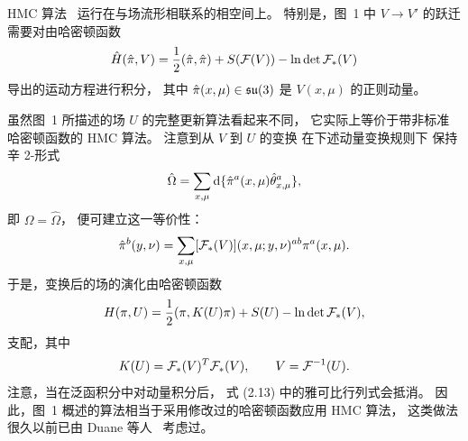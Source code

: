 HMC 算法~\cite{HMC} 运行在与场流形相联系的相空间上。
特别是，图~1 中 $V\to V'$ 的跃迁
需要对由哈密顿函数
\begin{equation}
  \hat{H}(\hat{\pi},V)=
  \frac{1}{2}(\hat{\pi},\hat{\pi})+
  S(\mathcal{F}(V))-\ln\det\mathcal{F}_{*}(V)
\end{equation}
导出的运动方程进行积分，
其中 $\hat{\pi}(x,\mu)\in\mathfrak{su}(3)$ 是 $V(x,\mu)$ 的正则动量。

虽然图~1 所描述的场 $U$ 的完整更新算法看起来不同，
它实际上等价于带非标准哈密顿函数的 HMC 算法。
注意到从 $V$ 到 $U$ 的变换
在下述动量变换规则下
保持辛 2-形式
\begin{equation}
  \hat{\Omega}=
  \sum_{x,\mu}\mathrm{d}\{\hat{\pi}^a(x,\mu)\hat{\theta}^a_{x,\mu}\},
\end{equation}
即 $\Omega=\hat{\Omega}$，
便可建立这一等价性：
\begin{equation}
  \hat{\pi}^b(y,\nu)
  =\sum_{x,\mu}[\mathcal{F}_{*}(V)](x,\mu;y,\nu)^{ab}\pi^a(x,\mu).
\end{equation}
于是，变换后的场的演化由哈密顿函数
\begin{equation}
  H(\pi,U)=
  \frac{1}{2}(\pi,K(U)\pi)+
  S(U)-\ln\det\mathcal{F}_{*}(V),
\end{equation}
支配，其中
\begin{equation}
  K(U)=\mathcal{F}_{*}(V)^T\mathcal{F}_{*}(V),\qquad V=\mathcal{F}^{-1}(U).
\end{equation}
注意，当在泛函积分中对动量积分后，
式 (2.13) 中的雅可比行列式会抵消。
因此，图~1 概述的算法相当于采用修改过的哈密顿函数应用 HMC 算法，
这类做法很久以前已由 Duane 等人~\cite{DuaneEtAl} 考虑过。
